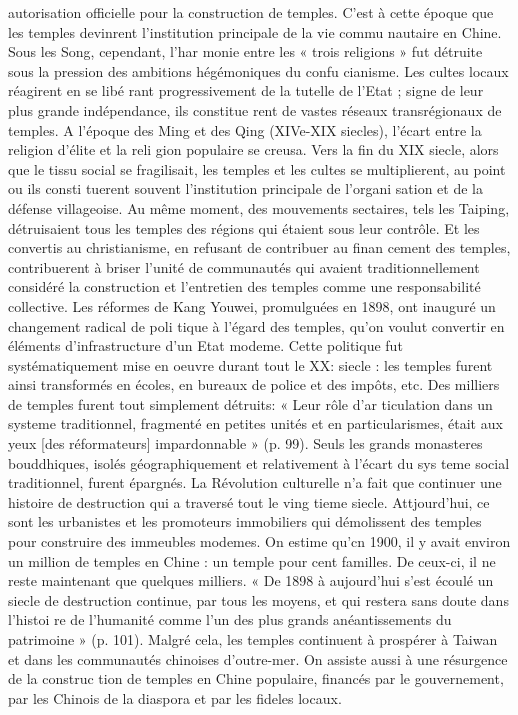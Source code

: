 autorisation officielle pour la construction de temples. C'est à cette époque que les temples devinrent l'institution principale de la vie commu nautaire en Chine. Sous les Song, cependant, l'har  monie entre les « trois religions » fut détruite sous la pression des ambitions hégémoniques du confu  cianisme. Les cultes locaux réagirent en se libé  rant progressivement de la tutelle de l'Etat ; signe de leur plus grande indépendance, ils constitue  rent de vastes réseaux transrégionaux de temples. A l'époque des Ming et des Qing (XIVe-XIX siecles), l'écart entre la religion d'élite et la reli  gion populaire se creusa. Vers la fin du XIX siecle, alors que le tissu social se fragilisait, les temples et les cultes se multiplierent, au point ou ils consti  tuerent souvent l'institution principale de l'organi  sation et de la défense villageoise. Au même moment, des mouvements sectaires, tels les Taiping, détruisaient tous les temples des régions qui étaient sous leur contrôle. Et les convertis au christianisme, en refusant de contribuer au finan  cement des temples, contribuerent à briser l'unité de communautés qui avaient traditionnellement considéré la construction et l'entretien des temples comme une responsabilité collective.
Les réformes de Kang Youwei, promulguées en 1898, ont inauguré un changement radical de poli  tique à l'égard des temples, qu'on voulut convertir en éléments d'infrastructure d'un Etat modeme. Cette politique fut systématiquement mise en oeuvre durant tout le XX: siecle : les temples furent ainsi transformés en écoles, en bureaux de police et des impôts, etc. Des milliers de temples furent tout simplement détruits: « Leur rôle d'ar  ticulation dans un systeme traditionnel, fragmenté en petites unités et en particularismes, était aux yeux [des réformateurs] impardonnable » (p. 99). Seuls les grands monasteres bouddhiques, isolés géographiquement et relativement à l'écart du sys  teme social traditionnel, furent épargnés. La Révolution culturelle n'a fait que continuer une histoire de destruction qui a traversé tout le ving  tieme siecle. Attjourd'hui, ce sont les urbanistes et les promoteurs immobiliers qui démolissent des temples pour construire des immeubles modemes. On estime qu'cn 1900, il y avait environ un million de temples en Chine : un temple pour
cent familles. De ceux-ci, il ne reste maintenant que quelques milliers. « De 1898 à aujourd'hui s'est écoulé un siecle de destruction continue, par tous les moyens, et qui restera sans doute dans l'histoi  re de l'humanité comme l'un des plus grands anéantissements du patrimoine » (p. 101). Malgré cela, les temples continuent à prospérer à Taiwan et dans les communautés chinoises d'outre-mer. On assiste aussi à une résurgence de la construc  tion de temples en Chine populaire, financés par le gouvernement, par les Chinois de la diaspora et par les fideles locaux.
